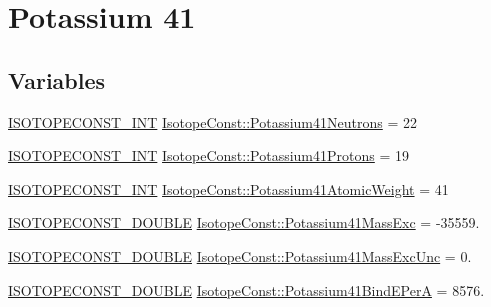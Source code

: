 \hypertarget{group___isotope_const-_potassium-_k41}{}\section{Potassium 41}
\label{group___isotope_const-_potassium-_k41}
\subsection*{Variables}
\begin{DoxyCompactItemize}
\item 
\mbox{\hyperlink{group___isotope_const-_macros_ga5f18360b3e99483a35c32d789e62621c}{I\+S\+O\+T\+O\+P\+E\+C\+O\+N\+S\+T\+\_\+\+I\+NT}} \mbox{\hyperlink{group___isotope_const-_potassium-_k41_ga51c1817b5c7db95ba0fd64b871a5dd3b}{Isotope\+Const\+::\+Potassium41\+Neutrons}} = 22
\item 
\mbox{\hyperlink{group___isotope_const-_macros_ga5f18360b3e99483a35c32d789e62621c}{I\+S\+O\+T\+O\+P\+E\+C\+O\+N\+S\+T\+\_\+\+I\+NT}} \mbox{\hyperlink{group___isotope_const-_potassium-_k41_ga05c56a5d0b0aeaf0c0bd85e975dd0484}{Isotope\+Const\+::\+Potassium41\+Protons}} = 19
\item 
\mbox{\hyperlink{group___isotope_const-_macros_ga5f18360b3e99483a35c32d789e62621c}{I\+S\+O\+T\+O\+P\+E\+C\+O\+N\+S\+T\+\_\+\+I\+NT}} \mbox{\hyperlink{group___isotope_const-_potassium-_k41_ga1381c787de604497e20e322797754c6d}{Isotope\+Const\+::\+Potassium41\+Atomic\+Weight}} = 41
\item 
\mbox{\hyperlink{group___isotope_const-_macros_ga8f45a7272ce02c0b4c65c44636ed719a}{I\+S\+O\+T\+O\+P\+E\+C\+O\+N\+S\+T\+\_\+\+D\+O\+U\+B\+LE}} \mbox{\hyperlink{group___isotope_const-_potassium-_k41_gaa319395ac1c9acd153bbb1323531b254}{Isotope\+Const\+::\+Potassium41\+Mass\+Exc}} = -\/35559.
\item 
\mbox{\hyperlink{group___isotope_const-_macros_ga8f45a7272ce02c0b4c65c44636ed719a}{I\+S\+O\+T\+O\+P\+E\+C\+O\+N\+S\+T\+\_\+\+D\+O\+U\+B\+LE}} \mbox{\hyperlink{group___isotope_const-_potassium-_k41_ga636e5487e13c6254eefdcc6fc3171c7f}{Isotope\+Const\+::\+Potassium41\+Mass\+Exc\+Unc}} = 0.
\item 
\mbox{\hyperlink{group___isotope_const-_macros_ga8f45a7272ce02c0b4c65c44636ed719a}{I\+S\+O\+T\+O\+P\+E\+C\+O\+N\+S\+T\+\_\+\+D\+O\+U\+B\+LE}} \mbox{\hyperlink{group___isotope_const-_potassium-_k41_gadcb6c8ff6f77f0f6c0ceccee85d35fee}{Isotope\+Const\+::\+Potassium41\+Bind\+E\+PerA}} = 8576.
\item 

\end{DoxyCompactItemize}
